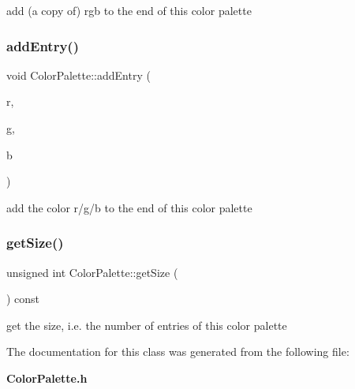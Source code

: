 add (a copy of) rgb to the end of this color palette \mbox{\label{classColorPalette_abc424ad9e51c0c35b252f17e339de0ff}} 
\subsubsection{add\+Entry()\hspace{0.1cm}{\footnotesize\ttfamily [2/2]}}
{\footnotesize\ttfamily void Color\+Palette\+::add\+Entry (\begin{DoxyParamCaption}\item[{\textbf{ B\+Y\+TE}}]{r,  }\item[{\textbf{ B\+Y\+TE}}]{g,  }\item[{\textbf{ B\+Y\+TE}}]{b }\end{DoxyParamCaption})\hspace{0.3cm}{\ttfamily [inline]}}

add the color r/g/b to the end of this color palette \mbox{\label{classColorPalette_aeaf501154a206ffb2080aaba22de6db8}} 
\subsubsection{get\+Size()}
{\footnotesize\ttfamily unsigned int Color\+Palette\+::get\+Size (\begin{DoxyParamCaption}\item[{void}]{ }\end{DoxyParamCaption}) const\hspace{0.3cm}{\ttfamily [inline]}}

get the size, i.\+e. the number of entries of this color palette 

The documentation for this class was generated from the following file\+:\begin{DoxyCompactItemize}
\item 
\textbf{ Color\+Palette.\+h}\end{DoxyCompactItemize}
